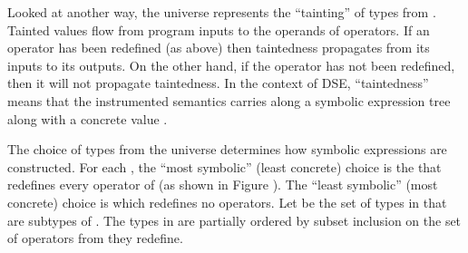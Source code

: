 \documentclass{IOS-Book-Article}
\begin{document}
\begin{mdP}[class={indent},data-line={436}]%
{}Looked at another way, the universe %
{}%
{} represents the %
{}{\textquotedblleft}tainting{\textquotedblright}%
{} of
types from %
{}%
{}. Tainted values flow from program inputs to the 
operands of operators. If an operator has been redefined
(as above) then taintedness propagates from its inputs to its outputs.
On the other hand, if the operator has not been redefined, then it will
not propagate taintedness. In the context of DSE, %
{}{\textquotedblleft}taintedness{\textquotedblright}%
{} means
that the instrumented semantics carries along a symbolic expression tree %
{}%
{}
along with a concrete value %
{}%
{}.%
\end{mdP}%
\begin{mdP}[class={indent},data-line={445}]%
{}The choice of types from the universe %
{}%
{} determines how symbolic
expressions are constructed. For each %
{}%
{}, the %
{}{\textquotedblleft}most symbolic{\textquotedblright}%
{}
(least concrete) choice is the %
{}%
{} that redefines every operator of %
{}%
{}
(as shown in Figure%
{}{\mdNbsp}%
{}).
The %
{}{\textquotedblleft}least symbolic{\textquotedblright}%
{} (most concrete) choice is %
{}%
{} which
redefines no operators.  Let %
{}%
{} be the
set of types in %
{}%
{} that are subtypes of %
{}%
{}. The types
in %
{}%
{} are partially ordered by subset inclusion on the 
set of operators from %
{}%
{} they redefine.%
\end{mdP}%
\end{document}
